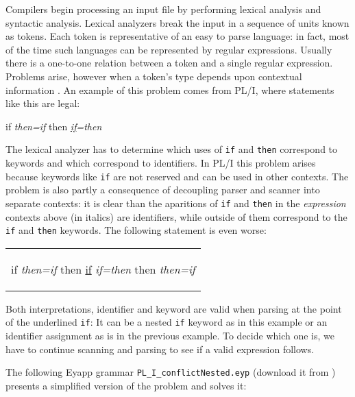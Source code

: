 Compilers begin processing an input file by performing lexical analysis and syntactic analysis.
Lexical analyzers break the input in a sequence of units known as tokens.
Each token is representative of an easy to parse language: in fact, most of the time such languages can be represented
by regular expressions.
Usually there is a one-to-one relation between a token and a single regular expression. 
Problems arise,
however when a token's type depends upon contextual information \cite{schrodingerstoken}.
An example of this problem comes from PL/I, where statements like this are
legal:
\begin{center}
\begin{VERBATIM}[numbers=none]
                   if \textit{then=if} then \textit{\underline{if}=then}
\end{VERBATIM}
\end{center}
The lexical analyzer has to determine which uses of \verb|if| and \verb|then| 
correspond to keywords and which correspond to identifiers.
In PL/I this problem arises because keywords like \verb|if| are not reserved and can be used in
other contexts. 
The problem is also partly a consequence of
decoupling parser and scanner into separate contexts: it is clear than the 
aparitions of \verb|if| and \verb|then| in the {\it expression} contexts above 
(in italics) are identifiers,
while outside of them correspond to the \verb|if| and \verb|then| keywords.
The following statement is  even worse:
\begin{center}
\begin{tabular}{p{74.08mm}}
\begin{VERBATIM}[numbers=none]
if \textit{then=if} then \underline{if} \textit{if=then} then \textit{then=if}
\end{VERBATIM}
\end{tabular}
\end{center}
Both interpretations, identifier and keyword are valid
when parsing at the point of the underlined \verb|if|: It
can be a nested \verb|if| keyword as in this example or an identifier
assignment as is in the previous example. To decide which one is,
we have to continue scanning and parsing to see if a valid expression
follows.

The following Eyapp grammar \verb|PL_I_conflictNested.eyp| 
(download it from \cite{lgforte})
presents a simplified version of the problem 
and solves it:

